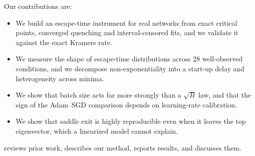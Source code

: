 \noindent Our contributions are:
\begin{itemize}[leftmargin=*,itemsep=0pt,topsep=0pt]
    \item We build an escape-time instrument for real networks from exact critical points, converged quenching and interval-censored fits, and we validate it against the exact Kramers rate.
    \item We measure the shape of escape-time distributions across 28 well-observed conditions, and we decompose non-exponentiality into a start-up delay and heterogeneity across minima.
    \item We show that batch size acts far more strongly than a $\sqrt{B}$ law, and that the sign of the Adam--SGD comparison depends on learning-rate calibration.
    \item We show that saddle exit is highly reproducible even when it leaves the top eigenvector, which a linearized model cannot explain.
\end{itemize}

\vspace{4pt}
\noindent {} reviews prior work,  describes our method,  reports results, and  discusses them.
